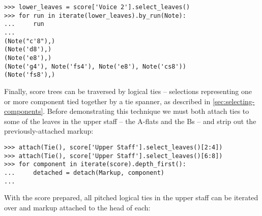 \begin{comment}
<abjad>
lower_leaves = score['Voice 2'].select_leaves()
for run in iterate(lower_leaves).by_run(Note):
    run

</abjad>
\end{comment}

\begin{abjadbookoutput}
\begin{singlespacing}
\vspace{-0.5\baselineskip}
\begin{lstlisting}
>>> lower_leaves = score['Voice 2'].select_leaves()
>>> for run in iterate(lower_leaves).by_run(Note):
...     run
...
(Note("c'8"),)
(Note('d8'),)
(Note('e8'),)
(Note('g4'), Note('fs4'), Note('e8'), Note('cs8'))
(Note('fs8'),)
\end{lstlisting}
\end{singlespacing}
\end{abjadbookoutput}

\noindent Finally, score trees can be traversed by logical ties -- selections
representing one or more component tied together by a tie spanner, as described
in \autoref{sec:selecting-components}. Before demonstrating this technique we
must both attach ties to some of the leaves in the upper staff -- the A-flats
and the Bs -- and strip out the previously-attached markup:

\begin{comment}
<abjad>
attach(Tie(), score['Upper Staff'].select_leaves()[2:4])
attach(Tie(), score['Upper Staff'].select_leaves()[6:8])
for component in iterate(score).depth_first():
    detached = detach(Markup, component)

</abjad>
\end{comment}

\begin{abjadbookoutput}
\begin{singlespacing}
\vspace{-0.5\baselineskip}
\begin{lstlisting}
>>> attach(Tie(), score['Upper Staff'].select_leaves()[2:4])
>>> attach(Tie(), score['Upper Staff'].select_leaves()[6:8])
>>> for component in iterate(score).depth_first():
...     detached = detach(Markup, component)
...
\end{lstlisting}
\end{singlespacing}
\end{abjadbookoutput}

\noindent With the score prepared, all pitched logical ties in the upper staff
can be iterated over and markup attached to the head of each:

